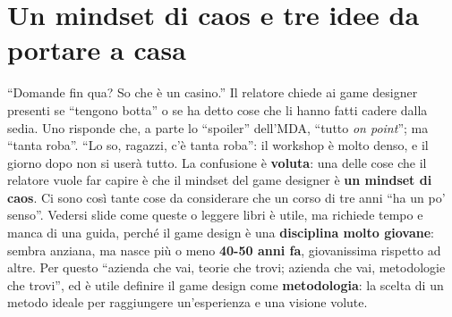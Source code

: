 \section{Un mindset di caos e tre idee da portare a casa}
\label{sec:z6-tre-idee}

``Domande fin qua? So che è un casino.'' Il relatore chiede ai game designer
presenti se ``tengono botta'' o se ha detto cose che li hanno fatti cadere dalla
sedia. Uno risponde che, a parte lo ``spoiler'' dell'MDA, ``tutto \emph{on
point}''; ma ``tanta roba''. ``Lo so, ragazzi, c'è tanta roba'': il workshop è
molto denso, e il giorno dopo non si userà tutto. La confusione è
\textbf{voluta}: una delle cose che il relatore vuole far capire è che il
mindset del game designer è \textbf{un mindset di caos}. Ci sono così tante cose
da considerare che un corso di tre anni ``ha un po' senso''. Vedersi slide come
queste o leggere libri è utile, ma richiede tempo e manca di una guida, perché il
game design è una \textbf{disciplina molto giovane}: sembra anziana, ma nasce più
o meno \textbf{40-50 anni fa}, giovanissima rispetto ad altre. Per questo
``azienda che vai, teorie che trovi; azienda che vai, metodologie che trovi'', ed
è utile definire il game design come \textbf{metodologia}: la scelta di un metodo
ideale per raggiungere un'esperienza e una visione volute.

